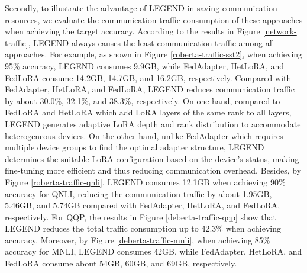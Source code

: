 Secondly, to illustrate the advantage of LEGEND in saving communication resources, we evaluate the communication traffic consumption of these approaches when achieving the target accuracy.
According to the results in Figure \ref{network-traffic}, LEGEND always causes the least communication traffic among all approaches. 
For example, as shown in Figure \ref{roberta-traffic-sst2}, when achieving 95\% accuracy, LEGEND consumes 9.9GB, while FedAdapter, HetLoRA, and FedLoRA consume 14.2GB, 14.7GB, and 16.2GB, respectively.
Compared with FedAdapter, HetLoRA, and FedLoRA, LEGEND reduces communication traffic by about 30.0\%, 32.1\%, and 38.3\%, respectively.
On one hand, compared to FedLoRA and HetLoRA which add LoRA layers of the same rank to all layers, LEGEND generates adaptive LoRA depth and rank distribution to accommodate heterogeneous devices. 
On the other hand, unlike FedAdapter which requires multiple device groups to find the optimal adapter structure, LEGEND determines the suitable LoRA configuration based on the device's status, making fine-tuning more efficient and thus reducing communication overhead.
Besides, by Figure \ref{roberta-traffic-qnli}, LEGEND consumes 12.1GB when achieving 90\% accuracy for QNLI, reducing the communication traffic by about 1.95GB, 5.46GB, and 5.74GB  compared with FedAdapter, HetLoRA, and FedLoRA, respectively.
For QQP, the results in Figure \ref{deberta-traffic-qqp} show that LEGEND reduces the total traffic consumption up to 42.3\% when achieving accuracy. 
Moreover, by Figure \ref{deberta-traffic-mnli}, when achieving 85\% accuracy for MNLI, LEGEND consumes 42GB, while FedAdapter, HetLoRA, and FedLoRA consume about 54GB, 60GB, and 69GB, respectively. 



